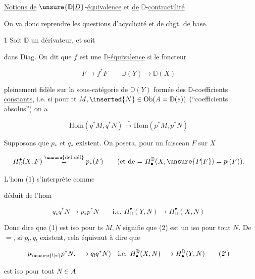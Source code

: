 
 \uline{Notions de} $\unsure{\mathbb D|\underline D}$-\uline{équivalence} et \uline{de} $\mathbb D$-\uline{contractilité}

On va donc reprendre les questions d'acyclicité et de chgt. de base.

 1 Soit $\mathbb D$ un dérivateur, et soit


dans $\mathrm{Diag}$. On dit que $f$ est une \uline{$\mathbb D$-équivalence} si le foncteur

\[ F\longrightarrow f^*F \qquad \mathbb D(Y)\longrightarrow\mathbb D(X) \]

  pleinement fidèle sur la sous-catégorie de $\mathbb D(Y)$ formée des $\mathbb D$-coefficients \uline{constants}, i.e. si pour tt $M,\inserted{N}\in\mathrm{Ob}(A=\mathbb D(e))$ (``coefficients absolus'') on a

\[ \mathrm{Hom}(q^*M,q^*N)\xrightarrow{\sim}\mathrm{Hom}(p^*M,p^*N) \tag*{(1)} \]

Supposons que $p_*$ et $q_*$ existent. On posera, pour un faisceau $F$ sur $X$

\[ H^{\bullet}_{\mathbb D}(X,F)\overset{\text{\unsure{def|déf}}}{=}p_*(F)\qquad
(\text{et de }{=} \ H_{\bullet}^{\mathbb D}(X,\unsure{P|F})=p_!(F)). \]


L'hom (1) s'interprète  comme


déduit de l'hom

\[ q_*q^*N\longrightarrow p_*p^*N\qquad\text{i.e. }H^\bullet_{\mathbb D}(Y,N)\longrightarrow H^\bullet_{\mathbb D}(X,N)\tag*{(2)} \]

Donc dire que (1) est iso pour ts $M,N$ signifie que (2) est un iso pour tout $N$. De $=$, si $p_!,q_!$ existent, cela équivaut à dire que

\[ p_{\unsure{!|*}}p^*N.\longrightarrow q_!q^*N)\quad\text{i.e. }H_\bullet^{\mathbb D}(X,N)\longrightarrow H_\bullet^{\mathbb D}(Y,N)\tag*{($2'$)} \]

est  iso  pour tout $N\in A$
